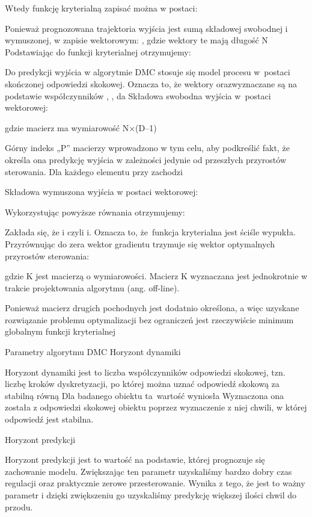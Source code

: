Wtedy funkcję kryterialną zapisać można w postaci:



Ponieważ prognozowana trajektoria wyjścia jest sumą składowej swobodnej i wymuszonej, w zapisie wektorowym:
, gdzie wektory te mają długość N
Podstawiając do funkcji kryterialnej otrzymujemy:



Do predykcji wyjścia w algorytmie DMC stosuje się model procesu w postaci skończonej odpowiedzi skokowej. Oznacza to, że wektory  orazwyznaczane są na podstawie współczynników { , , da  } Składowa swobodna wyjścia w postaci wektorowej:



gdzie macierz ma wymiarowość N×(D–1) 

Górny indeks „P” macierzy wprowadzono w tym celu, aby podkreślić fakt, że określa ona predykcję wyjścia w zależności jedynie od przeszłych przyrostów sterowania. Dla każdego elementu  przy  zachodzi  

Składowa wymuszona wyjścia w postaci wektorowej:


Wykorzystując powyższe równania otrzymujemy:


Zakłada się, że i  czyli i. Oznacza to, że funkcja kryterialna jest ściśle wypukła. Przyrównując do zera wektor gradientu trzymuje się wektor optymalnych przyrostów sterowania:



gdzie K jest macierzą o wymiarowości. Macierz K wyznaczana jest jednokrotnie w trakcie projektowania algorytmu (ang. off-line).



Ponieważ macierz drugich pochodnych jest dodatnio określona, a więc uzyskane rozwiązanie problemu optymalizacji bez ograniczeń jest rzeczywiście minimum globalnym funkcji kryterialnej 






Parametry algorytmu DMC
	Horyzont dynamiki

Horyzont dynamiki jest to liczba współczynników odpowiedzi skokowej, tzn. liczbę kroków dyskretyzacji, po której można uznać odpowiedź skokową za stabilną równą  Dla badanego obiektu ta wartość wyniosła   Wyznaczona ona została z odpowiedzi skokowej obiektu poprzez wyznaczenie z niej chwili, w której odpowiedź jest stabilna.

	Horyzont predykcji

Horyzont predykcji jest to wartość na podstawie, której prognozuje się zachowanie modelu. Zwiększając ten parametr uzyskaliśmy bardzo dobry czas regulacji oraz praktycznie zerowe przesterowanie. Wynika z tego, że jest to ważny parametr i dzięki zwiększeniu go uzyskaliśmy predykcję większej ilości chwil do przodu.

